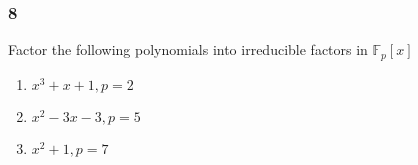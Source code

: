 \documentclass[11pt]{article}
\newcommand{\set}[1]{\mathbb{#1}}
\theoremstyle{definition}
\begin{document}
        \subsubsection{8}
        Factor the following polynomials into irreducible factors in $\set{F}_p[x]$
        \begin{enumerate}[label=\textbf{(\alph*)}]
            \item $x^3+x+1,p=2$

            \item $x^2-3x-3,p=5$

            \item $x^2+1,p=7$
        \end{enumerate} 
    
\end{document}
